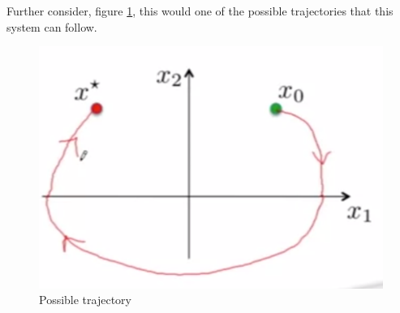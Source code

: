 Further consider, figure \ref{Fig_2_ch_8_rand3}, this would one of the possible trajectories that this system can follow.
\begin{figure}[h!]
	\centering
	\includegraphics[width=0.5\linewidth]{Bilder/SS3.png}
	\caption{Possible trajectory}
	\label{Fig_2_ch_8_rand3}
\end{figure}